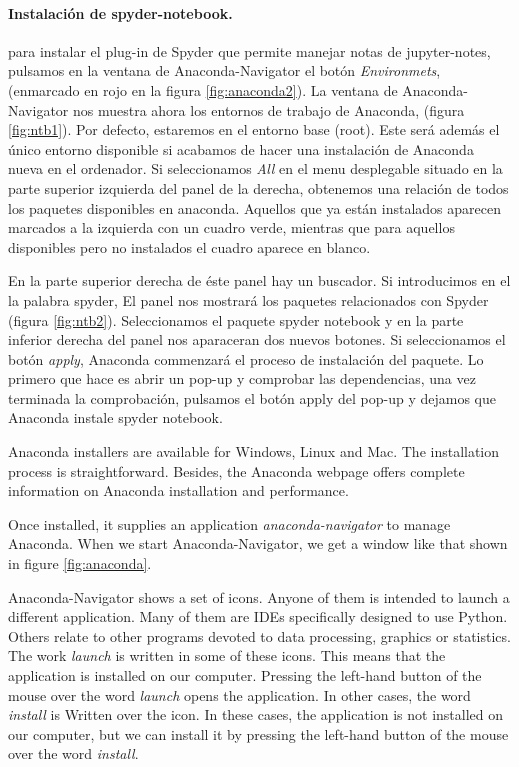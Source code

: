 \begin{paracol}{2}
 \paragraph{Instalación de spyder-notebook.} para instalar el plug-in de Spyder que permite manejar notas de jupyter-notes, pulsamos en la ventana de Anaconda-Navigator el botón \emph{Environmets}, (enmarcado en rojo en la figura \ref{fig:anaconda2}). La ventana de Anaconda-Navigator nos muestra ahora los entornos de trabajo de Anaconda, (figura \ref{fig:ntb1}). Por defecto, estaremos en el entorno base (root). Este será además el único entorno disponible si acabamos de hacer una instalación de Anaconda nueva en el ordenador. Si seleccionamos \emph{All} en el menu desplegable situado en la parte superior izquierda del panel de la derecha,  obtenemos una relación de todos los paquetes disponibles en anaconda. Aquellos que ya están instalados aparecen marcados a la izquierda con un cuadro verde, mientras que para aquellos disponibles pero no instalados el cuadro aparece en blanco.

 En la parte superior derecha de éste panel hay un buscador. Si introducimos en el la palabra spyder, El panel nos mostrará los paquetes relacionados con Spyder (figura \ref{fig:ntb2}). Seleccionamos el paquete spyder notebook y en la parte inferior derecha del panel nos aparaceran dos nuevos botones. Si seleccionamos el botón \emph{apply}, Anaconda commenzará el proceso de instalación del paquete. Lo primero que hace es abrir un pop-up y comprobar las dependencias, una vez terminada la comprobación, pulsamos el botón apply del pop-up y dejamos que Anaconda instale spyder notebook.
 

 \switchcolumn
 Anaconda installers are available for Windows, Linux and Mac. The installation process is straightforward. Besides, the Anaconda webpage offers complete information on Anaconda installation and performance.

 Once installed, it supplies an application \emph{anaconda-navigator} to manage Anaconda. When we start Anaconda-Navigator, we get a window like that shown in figure \ref{fig:anaconda}.

 Anaconda-Navigator shows a set of icons. Anyone of them is intended to launch a different application. Many of them are IDEs specifically designed to use Python. Others relate to other programs devoted to data processing, graphics or statistics. The work \emph{launch} is written in some of these icons. This means that the application is installed on our computer. Pressing the left-hand button of the mouse over the word \emph{launch} opens the application. In other cases, the word \emph{install} is Written over the icon. In these cases, the application is not installed on our computer, but we can install it by pressing the left-hand button of the mouse over the word \emph{install}.


\end{paracol}
